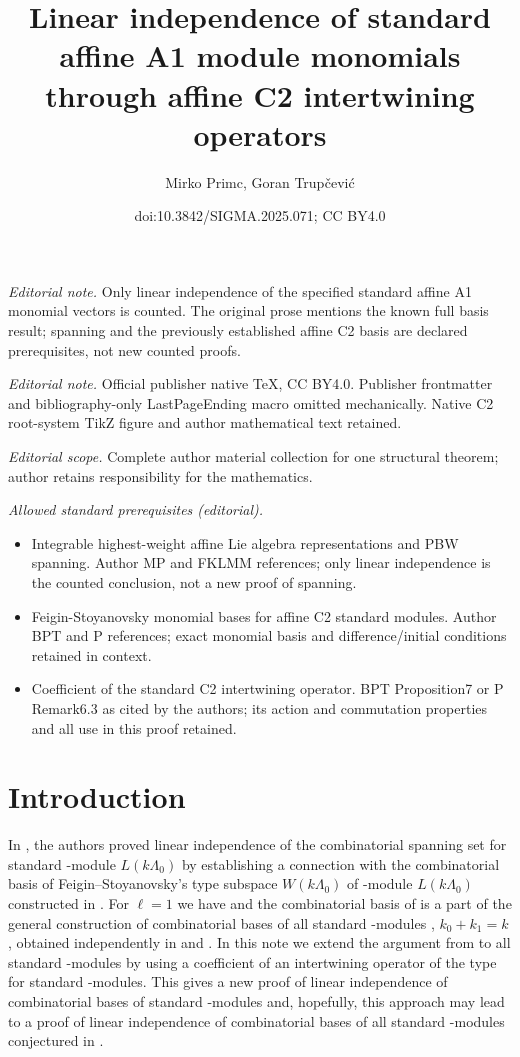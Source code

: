 \documentclass[10pt,a4paper]{amsart}
\title{Linear independence of standard affine A1 module monomials through affine C2 intertwining operators}
\author{Mirko Primc, Goran Trupčević}
\date{doi:10.3842/SIGMA.2025.071; CC BY4.0}
\numberwithin{equation}{section}
\begin{document}
\maketitle
\noindent\textit{Editorial note.} Only linear independence of the specified standard affine A1 monomial vectors is counted. The original prose mentions the known full basis result; spanning and the previously established affine C2 basis are declared prerequisites, not new counted proofs.\par\medskip
\noindent\textit{Editorial note.} Official publisher native TeX, CC BY4.0. Publisher frontmatter and bibliography-only LastPageEnding macro omitted mechanically. Native C2 root-system TikZ figure and author mathematical text retained.\par\medskip
\noindent\textit{Editorial scope.} Complete author material collection for one structural theorem; author retains responsibility for the mathematics.\par\medskip
\noindent\textit{Allowed standard prerequisites (editorial).}\begin{itemize}
\item Integrable highest-weight affine Lie algebra representations and PBW spanning. Author MP and FKLMM references; only linear independence is the counted conclusion, not a new proof of spanning.
\item Feigin-Stoyanovsky monomial bases for affine C2 standard modules. Author BPT and P references; exact monomial basis and difference/initial conditions retained in context.
\item Coefficient of the standard C2 intertwining operator. BPT Proposition7 or P Remark6.3 as cited by the authors; its action and commutation properties and all use in this proof retained.
\end{itemize}\medskip
\section{Introduction}

In \cite{PT}, the authors proved linear independence of the combinatorial spanning set for standard -module $L(k\Lambda_0)$ by establishing a connection with the combinatorial basis of Feigin--Stoyanovsky's type subspace $W(k\Lambda_0)$ of -module $L(k\Lambda_0)$ constructed in \cite{BPT}. For $\ell=1$ we have  and the combinatorial basis of  is a part of the general construction of combinatorial bases of all standard -modules , $k_0+k_1=k$, obtained independently in \cite{MP} and \cite{FKLMM}.
In this note we extend the argument from \cite{PT} to all standard -modules by using a coefficient of an intertwining operator of the type  for standard -modules. This gives a new proof of linear independence of combinatorial bases of standard -modules and, hopefully, this approach may lead to a proof of linear independence of combinatorial bases of all standard -modules conjectured in \cite{CMPP}.
\end{document}

